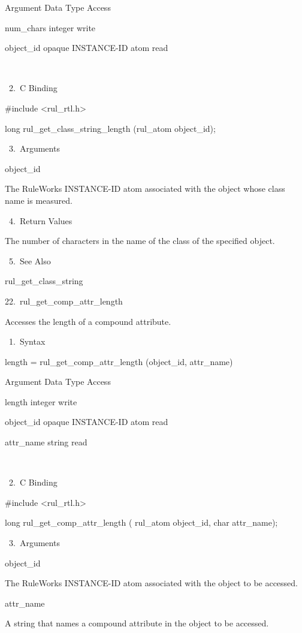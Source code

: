           Argument  Data Type     Access

          num_chars  integer     write

          object_id  opaque INSTANCE-ID atom
           read

           

       2. C Binding

          #include <rul_rtl.h>

          long rul_get_class_string_length
          (rul_atom object_id);

       3. Arguments

          object_id

          The RuleWorks INSTANCE-ID atom
          associated with the object whose
          class name is measured.

       4. Return Values

          The number of characters in the name
          of the class of the specified
          object.

       5. See Also

    rul_get_class_string

22. rul_get_comp_attr_length

    Accesses the length of a compound
    attribute.

       1. Syntax

          length = rul_get_comp_attr_length
          (object_id, attr_name)

          Argument  Data Type     Access

          length  integer     write

          object_id  opaque INSTANCE-ID atom
           read

          attr_name  string     read

           

       2. C Binding

          #include <rul_rtl.h>

          long rul_get_comp_attr_length (
          rul_atom object_id,
          char attr_name);

       3. Arguments

          object_id

          The RuleWorks INSTANCE-ID atom
          associated with the object to be
          accessed.

          attr_name

          A string that names a compound
          attribute in the object to be
          accessed.

